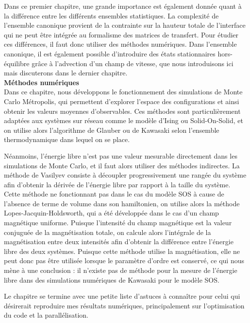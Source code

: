 Dans ce premier chapitre, une grande importance est également donnée quant à la différence entre les différents ensembles statistiques. La complexité de l'ensemble canonique provient de la contrainte sur la hauteur totale de l'interface qui ne peut être intégrée au formalisme des matrices de transfert. Pour étudier ces différences, il faut donc utiliser des méthodes numériques. Dans l'ensemble canonique, il est également possible d'introduire des états stationnaires hors-équilibre grâce à l'advection d'un champ de vitesse, que nous introduisons ici mais discuterons dans le dernier chapitre.\\


{\bf \large Méthodes numériques} \\

Dans ce chapitre, nous développons le fonctionnement des simulations de Monte Carlo Métropolis, qui permettent d'explorer l'espace des configurations et ainsi obtenir les valeurs moyennes d'observables. Ces méthodes sont particulièrement adaptées aux systèmes sur réseau comme le modèle d'Ising ou Solid-On-Solid, et on utilise alors l'algorithme de Glauber ou de Kawasaki selon l'ensemble thermodynamique dans lequel on se place. 

Néanmoins, l'énergie libre n'est pas une valeur mesurable directement dans les simulations de Monte Carlo, et il faut alors utiliser des méthodes indirectes. La méthode de Vasilyev consiste à découpler progressivement une rangée du système afin d'obtenir la dérivée de l'énergie libre par rapport à la taille du système. Cette méthode ne fonctionnant pas dans le cas du modèle SOS à cause de l'absence de terme de volume dans son hamiltonien, on utilise alors la méthode Lopes-Jacquin-Holdsworth, qui a été développée dans le cas d'un champ magnétique uniforme. Puisque l'intensité du champ magnétique est la valeur conjuguée de la magnétisation totale, on calcule alors l'intégrale de la magnétisation entre deux intensités afin d'obtenir la différence entre l'énergie libre des deux systèmes. Puisque cette méthode utilise la magnétisation, elle ne peut donc pas être utilisée lorsque le paramètre d'ordre est conservé, ce qui nous mène à une conclusion : il n'existe pas de méthode pour la mesure de l'énergie libre dans des simulations numériques de Kawasaki pour le modèle SOS.

Le chapitre se termine avec une petite liste d'astuces à connaître pour celui qui désirerait reproduire mes résultats numériques, principalement sur l'optimisation du code et la parallélisation.\\

